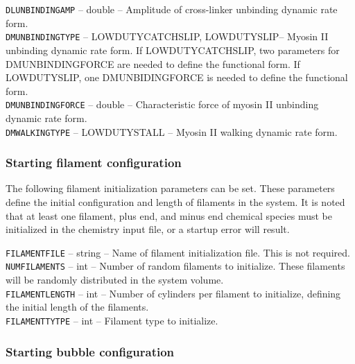 \documentclass[11pt, oneside]{article}   	%
\begin{document}
   \noindent\texttt{DLUNBINDINGAMP} -- double -- Amplitude of cross-linker unbinding dynamic rate form. \\
   
   \noindent\texttt{DMUNBINDINGTYPE} -- LOWDUTYCATCHSLIP, LOWDUTYSLIP-- Myosin II unbinding dynamic rate form.
  If LOWDUTYCATCHSLIP, two
  parameters for DMUNBINDINGFORCE are needed to define the functional form. 
  If LOWDUTYSLIP, one 
  DMUNBIDINGFORCE is needed to define the functional form. \\
   
   \noindent\texttt{DMUNBINDINGFORCE} -- double -- Characteristic force of myosin II unbinding dynamic rate form. \\
   
   \noindent\texttt{DMWALKINGTYPE} -- LOWDUTYSTALL -- Myosin II walking dynamic rate form. \\ 
 
\normalsize

\subsubsection{Starting filament configuration}

The following filament initialization parameters can be set. These parameters define the initial configuration and length
of filaments in the system. It is noted that at least one filament, plus end, and minus end chemical species must be initialized in the chemistry input file, or a startup error will result.\\

\small

  \noindent\texttt{FILAMENTFILE} -- string -- Name of filament initialization file. This is not required.\\

  \noindent\texttt{NUMFILAMENTS} -- int -- Number of random filaments to initialize. These filaments will be randomly 
  distributed in the system volume.\\

  \noindent\texttt{FILAMENTLENGTH} -- int -- Number of cylinders per filament to initialize, defining the initial length of the filaments.\\
  
   \noindent\texttt{FILAMENTTYTPE} -- int -- Filament type to initialize.\\

\normalsize

\subsubsection{Starting bubble configuration}
\end{document}
